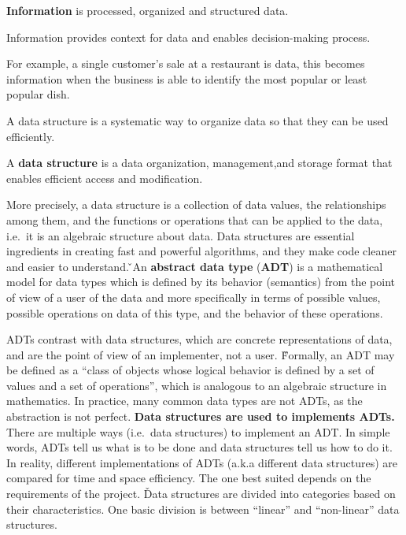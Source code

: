 \bd[Information]
\textbf{Information} is processed, organized and structured data.
\ed

Information provides context for data and enables decision-making process.

\be
For example, a single customer's sale at a restaurant is data, this becomes information when the business is able to
identify the most popular or least popular dish.
\ee

A data structure is a systematic way to organize data so that they can be used efficiently.

A \textbf{data structure} is a data organization, management,and storage format that enables efficient access and
modification.
\ed

More precisely, a data structure is a collection of data values, the relationships among them, and the functions or
operations that can be applied to the data, i.e.\ it is an algebraic structure about data. Data structures are
essential ingredients in creating fast and powerful algorithms, and they make code cleaner and easier to understand. \v

An \textbf{abstract data type} (\textbf{ADT}) is a mathematical model for data types which is defined by its behavior
(semantics) from the point of view of a user of the data and more specifically in terms of possible values, possible
operations on data of this type, and the behavior of these operations.
\ed

ADTs contrast with data structures, which are concrete representations of data, and are the point of view of an
implementer, not a user. \v

Formally, an ADT may be defined as a ``class of objects whose logical behavior is defined by a set of values and a
set of operations'', which is analogous to an algebraic structure in mathematics. In practice, many common data types
are not ADTs, as the abstraction is not perfect. \v

\textbf{Data structures are used to implements ADTs.} There are multiple ways (i.e.\ data structures) to implement an
ADT. In simple words, ADTs tell us what is to be done and data structures tell us how to do it. In reality, different
implementations of ADTs (a.k.a different data structures) are compared for time and space efficiency. The one best
suited depends on the requirements of the project. \v

Data structures are divided into categories based on their characteristics. One basic division is between ``linear''
and ``non-linear'' data structures.

